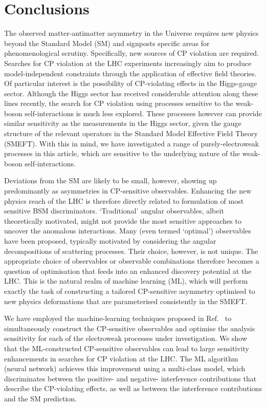\documentclass[twocolumn,preprintnumbers,superscriptaddress,nofootinbib,aps,prd,floatfix]{revtex4}
\begin{document}
\section{Conclusions}
\label{sec:conc}
The observed matter-antimatter asymmetry in the Universe requires new physics beyond the Standard Model (SM) and signposts specific areas for phenomenological scrutiny. Specifically, new sources of CP violation are required. Searches for CP violation at the LHC experiments increasingly aim to produce model-independent constraints through the application of effective field theories. Of particular interest is the possibility of CP-violating effects in the Higgs-gauge sector. Although the Higgs sector has received considerable attention along these lines recently, the search for CP violation using processes sensitive to the weak-boson self-interactions is much less explored. These processes however can provide similar sensitivity as the measurements in the Higgs sector, given the gauge structure of the relevant operators in the Standard Model Effective Field Theory (SMEFT). With this in mind, we have investigated a range of purely-electroweak processes in this article, which are sensitive to the underlying nature of the weak-boson self-interactions.


Deviations from the SM are likely to be small, however, showing up predominantly as asymmetries in CP-sensitive observables. Enhancing the new physics reach of the LHC is therefore directly related to formulation of most sensitive BSM discriminators. `Traditional' angular observables, albeit theoretically motivated, might not provide the most sensitive approaches to uncover the anomalous interactions. Many (even termed `optimal') observables have been proposed, typically motivated by considering the angular decompositions of scattering processes. Their choice, however, is not unique. The appropriate choice of observables or observable combinations therefore becomes a question of optimisation that feeds into an enhanced discovery potential at the LHC. This is the natural realm of machine learning (ML), which will perform exactly the task of constructing a tailored CP-sensitive asymmetry optimised to new physics deformations that are parameterised consistently in the SMEFT. 

We have employed the machine-learning techniques proposed in Ref.~\cite{Bhardwaj:2021ujv} to simultaneously construct the CP-sensitive observables and optimise the analysis sensitivity for each of the electroweak processes under investigation. We show that the ML-constructed CP-sensitive observables can lead to large sensitivity enhancements in searches for CP violation at the LHC. The ML algorithm (neural network) achieves this improvement using a multi-class model, which discriminates between the positive- and negative- interference contributions that describe the CP-violating effects, as well as between the interference contributions and the SM prediction. 
\end{document}
